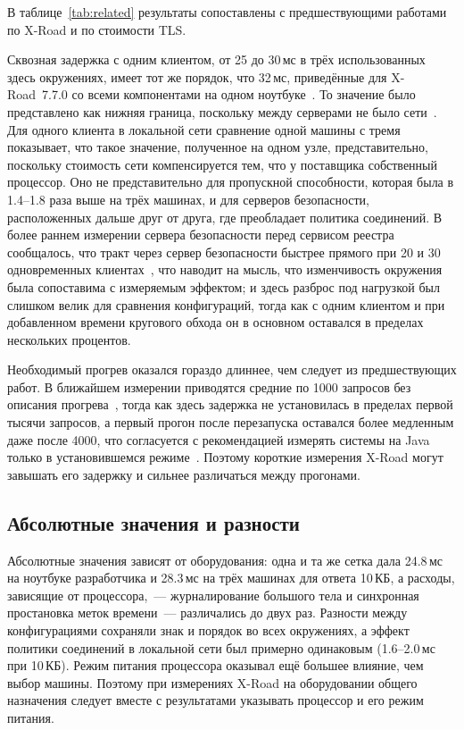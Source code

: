 \documentclass[conference,a4paper]{IEEEtran}
\begin{document}
{\color{blue}В таблице~\ref{tab:related} результаты сопоставлены с предшествующими работами по X-Road и по стоимости TLS.\par}


Сквозная задержка с одним клиентом, от 25 до 30\,мс в трёх использованных здесь окружениях, имеет тот же
порядок, что 32\,мс, приведённые для X-Road~7.7.0 со всеми компонентами на одном ноутбуке~\cite{bakhtina2026ijis}.
То значение было представлено как нижняя граница, поскольку между серверами не было
сети~\cite{bakhtina2026ijis}. Для одного клиента в локальной сети сравнение одной машины с
тремя показывает, что такое значение, полученное на одном узле, представительно, поскольку стоимость сети
компенсируется тем, что у поставщика собственный процессор. Оно не представительно для пропускной способности, которая была
в 1.4--1.8 раза выше на трёх машинах, и для серверов безопасности, расположенных дальше друг от друга, где
преобладает политика соединений. В более раннем измерении сервера безопасности перед сервисом
реестра сообщалось, что тракт через сервер безопасности быстрее прямого при 20 и 30
одновременных клиентах~\cite{taklai2020}, что наводит на мысль, что изменчивость окружения была
сопоставима с измеряемым эффектом; и здесь разброс под нагрузкой был слишком велик для сравнения
конфигураций, тогда как с одним
клиентом и при добавленном времени кругового обхода он в основном оставался в пределах нескольких процентов.

Необходимый прогрев оказался гораздо длиннее, чем следует из предшествующих работ. В ближайшем измерении приводятся
средние по 1000 запросов без описания прогрева~\cite{bakhtina2026ijis}, тогда как здесь задержка не установилась
в пределах первой тысячи запросов, а первый прогон после перезапуска оставался более медленным даже после 4000, что согласуется с
рекомендацией измерять системы на Java только в установившемся режиме~\cite{georges2007}. Поэтому короткие измерения
X-Road могут завышать его задержку и сильнее различаться между прогонами.

\subsection{Абсолютные значения и разности}

Абсолютные значения зависят от оборудования: одна и та же сетка дала 24.8\,мс на ноутбуке разработчика и
28.3\,мс на трёх машинах для ответа 10\,КБ, а расходы, зависящие от процессора,~--- журналирование большого тела
и синхронная простановка меток времени~--- различались до двух раз. Разности между
конфигурациями сохраняли знак и порядок во всех окружениях, а эффект политики
соединений в локальной сети был примерно одинаковым (1.6--2.0\,мс при 10\,КБ). Режим питания процессора оказывал
ещё большее влияние, чем выбор машины. Поэтому при измерениях X-Road на оборудовании общего назначения
следует вместе с результатами указывать процессор и его режим питания.
\end{document}
